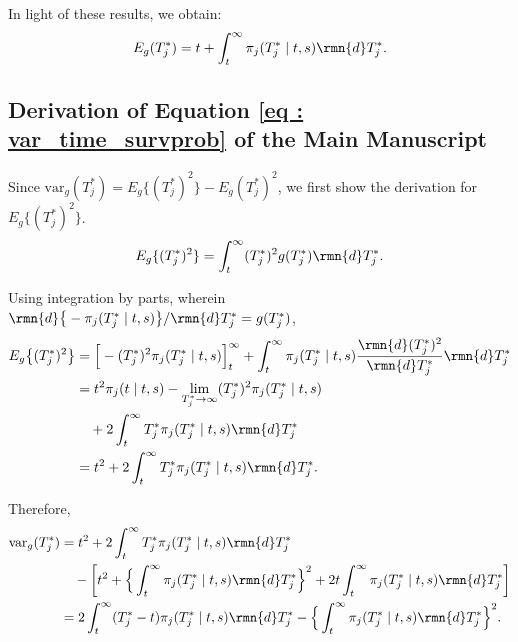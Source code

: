 In light of these results, we obtain:
\begin{equation*}
E_g(T^*_j) = t + \int_t^{\infty} \pi_j(T^*_j \mid t, s) \rmn{d} T^*_j.
\end{equation*}

\subsection{Derivation of Equation \ref{eq : var_time_survprob} of the Main Manuscript}
Since $\mbox{var}_g(T^*_j) = E_g\{(T^*_j)^2\} - E_g(T^*_j)^2$, we first show the derivation for $E_g\{(T^*_j)^2\}$.
\begin{equation*}
E_g\{(T^*_j)^2\} = \int_t^{\infty} (T^*_j)^2 g(T^*_j)\rmn{d} T^*_j.
\end{equation*}

Using integration by parts, wherein ${\rmn{d} \big\{-\pi_j(T^*_j \mid t, s)\big\}}/{\rmn{d} T^*_j} = g(T^*_j)$,
\begin{equation*}
\begin{split}
E_g\big\{(T^*_j)^2\big\} &= \Big[-(T^*_j)^2\pi_j(T^*_j \mid t, s)\Big]_t^\infty + \int_t^{\infty} \pi_j(T^*_j \mid t, s) \frac{\rmn{d} (T^*_j)^2}{\rmn{d} T^*_j} \rmn{d} T^*_j\\
&= t^2 \pi_j(t \mid t, s) - \lim_{T^*_j\to \infty}(T^*_j)^2 \pi_j(T^*_j \mid t, s) \\& \quad + 2 \int_t^{\infty} T^*_j \pi_j(T^*_j \mid t, s) \rmn{d} T^*_j\\
&= t^2 + 2 \int_t^{\infty} T^*_j \pi_j(T^*_j \mid t, s) \rmn{d} T^*_j.
\end{split}
\end{equation*}

Therefore,
\begin{equation*}
\begin{split}
\mbox{var}_g(T^*_j) &= t^2 + 2 \int_t^{\infty} T^*_j \pi_j(T^*_j \mid t, s) \rmn{d} T^*_j \\ & \quad - \bigg[t^2 +  \Big\{\int_t^\infty \pi_j(T^*_j \mid t, s) \rmn{d} T^*_j \Big\}^2 + 2t\int_t^\infty \pi_j(T^*_j \mid t, s) \rmn{d} T^*_j \bigg]\\
&=2 \int_t^{\infty} (T^*_j - t) \pi_j(T^*_j \mid t, s) \rmn{d} T^*_j -  \Big\{\int_t^\infty \pi_j(T^*_j \mid t, s) \rmn{d} T^*_j \Big\}^2.
\end{split}
\end{equation*}
